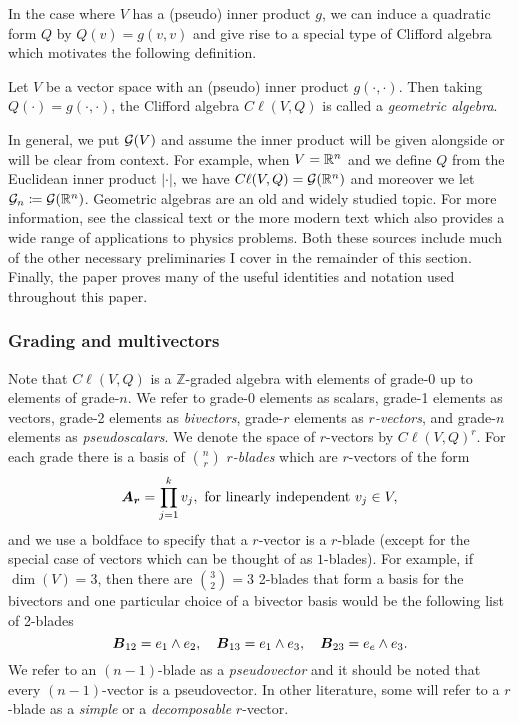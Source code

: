 In the case where $V$ has a (pseudo) inner product $g$, we can induce a quadratic form $Q$ by $Q(v)=g(v,v)$ and give rise to a special type of Clifford algebra which motivates the following definition.
\begin{definition}
Let $V$ be a vector space with an (pseudo) inner product $g(\cdot,\cdot)$. Then taking $Q(\cdot) = g(\cdot,\cdot)$, the Clifford algebra $C \ell(V,Q)$ is called a \emph{geometric algebra}.
\end{definition}
In general, we put $\mathcal{G}(V)$ and assume the inner product will be given alongside or will be clear from context.  For example, when $V=\mathbb{R}^n$ and we define $Q$ from the Euclidean inner product $|\cdot|$, we have $C\ell(V,Q)=\mathcal{G}(\mathbb{R}^n)$ and moreover we let $\mathcal{G}_n \coloneqq \mathcal{G}(\mathbb{R}^n)$. Geometric algebras are an old and widely studied topic. For more information, see the classical text \cite{hestenes_clifford_1986} or the more modern text \cite{doran_geometric_2003} which also provides a wide range of applications to physics problems. Both these sources include much of the other necessary preliminaries I cover in the remainder of this section. Finally, the paper \cite{chisolm_geometric_2012} proves many of the useful identities and notation used throughout this paper.

\subsubsection{Grading and multivectors}
Note that $C\ell(V,Q)$ is a $\mathbb{Z}$-graded algebra with elements of grade-0 up to elements of grade-$n$. We refer to grade-0 elements as scalars, grade-1 elements as vectors, grade-2 elements as \emph{bivectors}, grade-$r$ elements as \emph{$r$-vectors}, and grade-$n$ elements as \emph{pseudoscalars}. We denote the space of $r$-vectors by $C\ell(V,Q)^r$. For each grade there is a basis of ${n\choose r}$ \emph{$r$-blades} which are $r$-vectors of the form
\begin{equation}
\boldsymbol{A_r} = \prod_{j=1}^k v_j, ~\textrm{for linearly independent}~ v_j \in V,
\end{equation}
and we use a boldface to specify that a $r$-vector is a $r$-blade (except for the special case of vectors which can be thought of as $1$-blades). For example, if $\dim(V)=3$, then there are ${3\choose 2}=3$ 2-blades that form a basis for the bivectors and one particular choice of a bivector basis would be the following list of 2-blades
\begin{equation}
\label{eq:3_dim_basis}
\boldsymbol{B}_{12} = e_1 \wedge e_2, \quad \boldsymbol{B}_{13} = e_1 \wedge e_3, \quad \boldsymbol{B}_{23} = e_e \wedge e_3.
\end{equation}
We refer to an $(n-1)$-blade as a \emph{pseudovector} and it should be noted that every $(n-1)$-vector is a pseudovector. In other literature, some will refer to a $r$-blade as a \emph{simple} or a \emph{decomposable} $r$-vector. 

